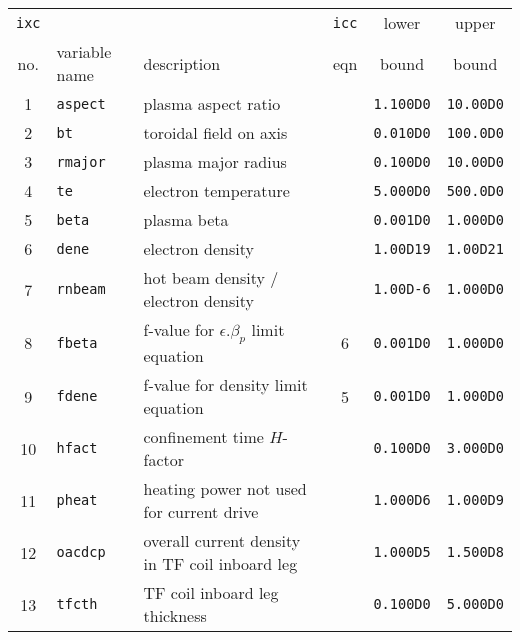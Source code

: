 \documentclass[11pt,a4paper]{report}
\begin{document}
\begin{table}[tbph]
\footnotesize
\begin{center}

\begin{tabular}{||c|l|l|c|c|c||} \hline
\texttt{ixc} &          &                                               & \texttt{icc} & lower        & upper       \\
no. & variable name     & description                                   & eqn & bound        & bound       \\ \hline
1   & \texttt{aspect}   & plasma aspect ratio                           &     & \texttt{1.100D0} & \texttt{10.00D0} \\
2   & \texttt{bt}       & toroidal field on axis                        &     & \texttt{0.010D0} & \texttt{100.0D0} \\
3   & \texttt{rmajor}   & plasma major radius                           &     & \texttt{0.100D0} & \texttt{10.00D0} \\
4   & \texttt{te}       & electron temperature                          &     & \texttt{5.000D0} & \texttt{500.0D0} \\
5   & \texttt{beta}     & plasma beta                                   &     & \texttt{0.001D0} & \texttt{1.000D0} \\
6   & \texttt{dene}     & electron density                              &     & \texttt{1.00D19} & \texttt{1.00D21} \\
7   & \texttt{rnbeam}   & hot beam density / electron density           &     & \texttt{1.00D-6} & \texttt{1.000D0} \\
8   & \texttt{fbeta}    & f-value for $\epsilon.\beta_p$ limit equation & 6   & \texttt{0.001D0} & \texttt{1.000D0} \\
9   & \texttt{fdene}    & f-value for density limit equation            & 5   & \texttt{0.001D0} & \texttt{1.000D0} \\
10  & \texttt{hfact}    & confinement time $H$-factor                   &     & \texttt{0.100D0} & \texttt{3.000D0} \\
11  & \texttt{pheat}    & heating power not used for current drive      &     & \texttt{1.000D6} & \texttt{1.000D9} \\
12  & \texttt{oacdcp}   & overall current density in TF coil inboard leg&     & \texttt{1.000D5} & \texttt{1.500D8} \\
13  & \texttt{tfcth}    & TF coil inboard leg thickness                 &     & \texttt{0.100D0} & \texttt{5.000D0} \\

\end{tabular}
\end{center}
\end{table}
\end{document}

